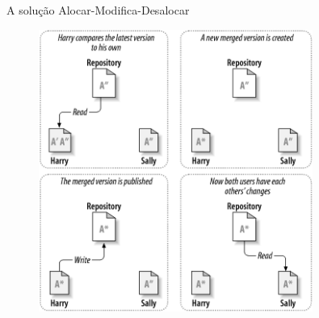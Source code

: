 \documentclass{beamer}
\begin{document}
\begin{frame}
\begin{columns}
\begin{column}{.5\textwidth}
\begin{block}{A solu\c{c}\~ao Alocar-Modifica-Desalocar}
\begin{figure}
                    \includegraphics[width=0.8\textwidth]{figures/copymodifymerge}
                \end{figure}
            \end{block}
        \end{column}
    \end{columns}
\end{frame}
\end{document}

